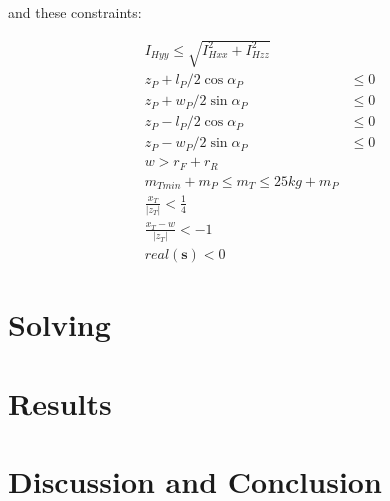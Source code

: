 \documentclass{bmd2019a}
\begin{document}
and these constraints:

\begin{align}
  I_{Hyy} \leq \sqrt{I_{Hxx}^2 + I_{Hzz}^2} \\
  z_P + l_P / 2 \cos{\alpha_P} & \leq 0 \\
  z_P + w_P / 2 \sin{\alpha_P} & \leq 0 \\
  z_P - l_P / 2 \cos{\alpha_P} & \leq 0 \\
  z_P - w_P / 2 \sin{\alpha_P} & \leq 0 \\
  w > r_F + r_R \\
  m_{Tmin} + m_P \leq m_T \leq 25 \si{kg} + m_P \\
  \frac{x_T}{|z_T|} < \frac{1}{4} \\
  \frac{x_T - w}{|z_T|} < -1 \\
  real(\mathbf{s}) < 0
\end{align}






\section*{Solving}
\section*{Results}
\section*{Discussion and Conclusion}
\end{document}
